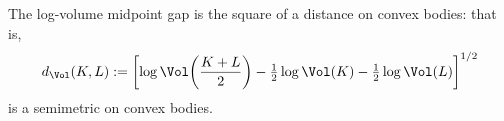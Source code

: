 The log-volume midpoint gap is the square of a distance on convex bodies: that is,
\[d_{\Vol}(K,L):=\left[\log\Vol\!\left(\frac{K+L}{2}\right)-\tfrac12\log\Vol(K)-\tfrac12\log\Vol(L)\right]^{1/2}\]
is a semimetric on convex bodies.
